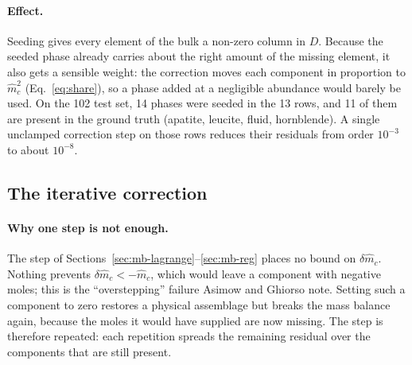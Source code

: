 \documentclass[11pt]{article}
\begin{document}
\paragraph{Effect.} Seeding gives every element of the bulk a non-zero column in $D$.
Because the seeded phase already carries about the right amount of the missing element, it
also gets a sensible weight: the correction moves each component in proportion to
$\hat m_c^2$ (Eq.~\ref{eq:share}), so a phase added at a negligible abundance would barely
be used. On the 102 test set, 14 phases were seeded in the 13 rows, and 11 of them are
present in the ground truth (apatite, leucite, fluid, hornblende). A single unclamped
correction step on those rows reduces their residuals from order $10^{-3}$ to about
$10^{-8}$.

\subsection{The iterative correction}
\label{sec:mb-iter}

\paragraph{Why one step is not enough.} The step of Sections~\ref{sec:mb-lagrange}--\ref{sec:mb-reg}
places no bound on $\delta\hat m_c$. Nothing prevents $\delta\hat m_c < -\hat m_c$, which
would leave a component with negative moles; this is the ``overstepping'' failure Asimow
and Ghiorso note. Setting such a component to zero restores a physical assemblage but
breaks the mass balance again, because the moles it would have supplied are now missing.
The step is therefore repeated: each repetition spreads the remaining residual over the
components that are still present.
\end{document}
